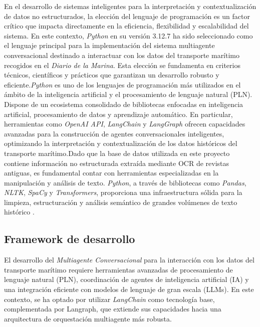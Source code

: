 En el desarrollo de sistemas inteligentes para la interpretación y contextualización de datos no estructurados, la elección del lenguaje de programación es un factor crítico que impacta directamente en la eficiencia, flexibilidad y escalabilidad del sistema. En este contexto, \textit{Python} en su versión 3.12.7 ha sido seleccionado como el lenguaje principal para la implementación del sistema multiagente conversacional destinado a interactuar con los datos del transporte marítimo recogidos en el \textit{Diario de la Marina}. Esta elección se fundamenta en criterios técnicos, científicos y prácticos que garantizan un desarrollo robusto y eficiente.\textit{Python} es uno de los lenguajes de programación más utilizados en el ámbito de la inteligencia artificial y el procesamiento de lenguaje natural (PLN). Dispone de un ecosistema consolidado de bibliotecas enfocadas en inteligencia artificial, procesamiento de datos y aprendizaje automático. En particular, herramientas como \textit{OpenAI API}, \textit{LangChain} y \textit{LangGraph} ofrecen capacidades avanzadas para la construcción de agentes conversacionales inteligentes, optimizando la interpretación y contextualización de los datos históricos del transporte marítimo.Dado que la base de datos utilizada en este proyecto contiene información no estructurada extraída mediante OCR de revistas antiguas, es fundamental contar con herramientas especializadas en la manipulación y análisis de texto. \textit{Python}, a través de bibliotecas como \textit{Pandas}, \textit{NLTK}, \textit{SpaCy} y \textit{Transformers}, proporciona una infraestructura sólida para la limpieza, estructuración y análisis semántico de grandes volúmenes de texto histórico \cite{bird2009natural, spacy2023nlp}.


\subsection{Framework de desarrollo}

El desarrollo del \textit{Multiagente Conversacional} para la interacción con los datos del transporte marítimo requiere herramientas avanzadas de procesamiento de lenguaje natural (PLN), coordinación de agentes de inteligencia artificial (IA) y una integración eficiente con modelos de lenguaje de gran escala (LLMs). En este contexto, se ha optado por utilizar \textit{LangChain} como tecnología base, complementada por Langraph, que extiende sus capacidades hacia una arquitectura de orquestación multiagente más robusta.

